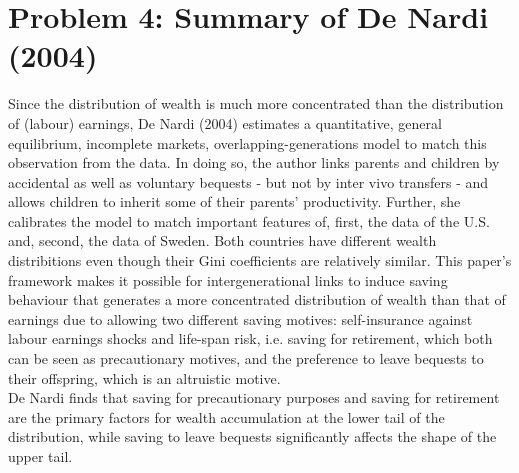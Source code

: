 \documentclass[12pt,a4paper]{article}
\begin{document}
\section*{Problem 4: Summary of De Nardi (2004)}
Since the distribution of wealth is much more concentrated than the distribution of (labour) earnings, De Nardi (2004) estimates a quantitative, general equilibrium, incomplete markets, overlapping-generations model to match this observation from the data. In doing so, the author links parents and children by accidental as well as voluntary bequests - but not by inter vivo transfers - and allows children to inherit some of their parents' productivity. Further, she calibrates the model to match important features of, first, the data of the U.S. and, second, the data of Sweden. Both countries have different wealth distribitions even though their Gini coefficients are relatively similar. This paper's framework makes it possible for intergenerational links to induce saving behaviour that generates a more concentrated distribution of wealth than that of earnings due to allowing two different saving motives: self-insurance against labour earnings shocks and life-span risk, i.e. saving for retirement, which both can be seen as precautionary motives, and the preference to leave bequests to their offspring, which is an altruistic motive.
\\
De Nardi finds that saving for precautionary purposes and saving for retirement are the primary factors for wealth accumulation at the lower tail of the distribution, while saving to leave bequests significantly affects the shape of the upper tail.
\end{document}
